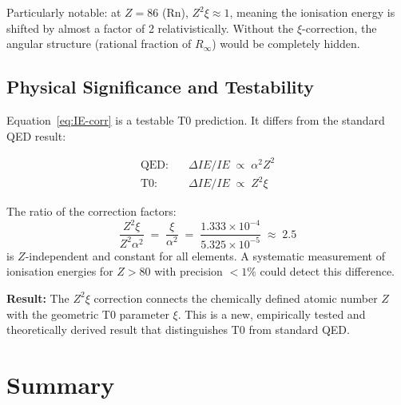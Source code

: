 Particularly notable: at $Z = 86$ (Rn), $Z^2\xi \approx 1$, meaning
the ionisation energy is shifted by almost a factor of 2 relativistically.
Without the $\xi$-correction, the angular structure (rational fraction of
$R_\infty$) would be completely hidden.

\subsection{Physical Significance and Testability}
\label{subsec:significance}

Equation~\eqref{eq:IE-corr} is a testable T0 prediction.
It differs from the standard QED result:

\begin{align}
  \text{QED:}\quad &\Delta IE/IE \;\propto\; \alpha^2 Z^2 \\
  \text{T0:}\quad  &\Delta IE/IE \;\propto\; Z^2 \xi
\end{align}

The ratio of the correction factors:
\begin{equation}
  \frac{Z^2 \xi}{Z^2 \alpha^2} \;=\; \frac{\xi}{\alpha^2}
  \;=\; \frac{1.333 \times 10^{-4}}{5.325 \times 10^{-5}}
  \;\approx\; 2.5
\end{equation}
is $Z$-independent and constant for all elements. A systematic measurement
of ionisation energies for $Z > 80$ with precision $<1\%$ could detect
this difference.

\textbf{Result:} The $Z^2\xi$ correction connects the chemically defined
atomic number $Z$ with the geometric T0 parameter $\xi$. This is a new,
empirically tested and theoretically derived result that distinguishes
T0 from standard QED.

\section{Summary}
\label{sec:169-summary}

\begin{table}[htbp]
\centering
\caption{Status of the three follow-up investigations}
\label{tab:status}
\end{table}

